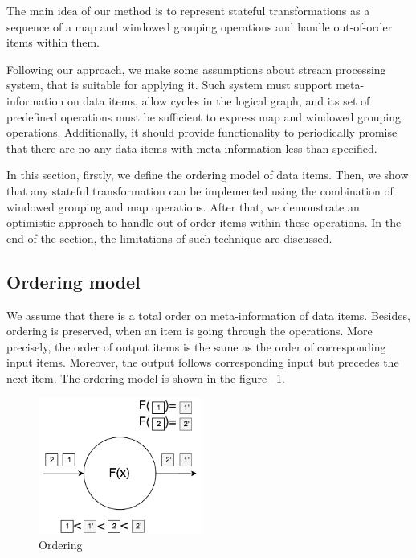 
\label {fs-optimistic}

The main idea of our method is to represent stateful transformations as a sequence of a map and windowed grouping operations and handle out-of-order items within them. 

Following our approach, we make some assumptions about stream processing system, that is suitable for applying it. Such system must support meta-information on data items, allow cycles in the logical graph, and its set of predefined operations must be sufficient to express map and windowed grouping operations. Additionally, it should provide functionality to periodically promise that there are no any data items with meta-information less than specified.

In this section, firstly, we define the ordering model of data items. Then, we show that any stateful transformation can be implemented using the combination of windowed grouping and map operations. After that, we demonstrate an optimistic approach to handle out-of-order items within these operations. In the end of the section, the limitations of such technique are discussed.

\subsection{Ordering model}
We assume that there is a total order on meta-information of data items. Besides, ordering is preserved, when an item is going through the operations. More precisely, the order of output items is the same as the order of corresponding input items. Moreover, the output follows corresponding input but precedes the next item. The ordering model is shown in the figure ~\ref{ordering}.

\begin{figure}[htbp]
  \centering
  \includegraphics[width=0.48\textwidth]{pics/ordering}
  \caption{Ordering}
  \label {ordering}
\end{figure}

